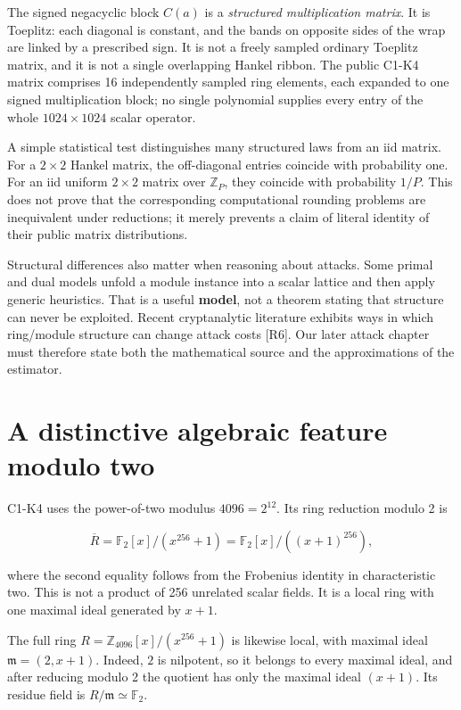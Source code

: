 \documentclass[
  11pt,
  a4paper,
  oneside]{report}
\begin{document}
The signed negacyclic block \(C(a)\) is a \emph{structured
multiplication matrix}. It is Toeplitz: each diagonal is constant, and
the bands on opposite sides of the wrap are linked by a prescribed sign.
It is not a freely sampled ordinary Toeplitz matrix, and it is not a
single overlapping Hankel ribbon. The public C1-K4 matrix comprises 16
independently sampled ring elements, each expanded to one signed
multiplication block; no single polynomial supplies every entry of the
whole \(1024\times1024\) scalar operator.

A simple statistical test distinguishes many structured laws from an iid
matrix. For a \(2\times2\) Hankel matrix, the off-diagonal entries
coincide with probability one. For an iid uniform \(2\times2\) matrix
over \(\mathbb Z_P\), they coincide with probability \(1/P\). This does
not prove that the corresponding computational rounding problems are
inequivalent under reductions; it merely prevents a claim of literal
identity of their public matrix distributions.

Structural differences also matter when reasoning about attacks. Some
primal and dual models unfold a module instance into a scalar lattice
and then apply generic heuristics. That is a useful \textbf{model}, not
a theorem stating that structure can never be exploited. Recent
cryptanalytic literature exhibits ways in which ring/module structure
can change attack costs {[}R6{]}. Our later attack chapter must
therefore state both the mathematical source and the approximations of
the estimator.

\section{A distinctive algebraic feature modulo
two}\label{a-distinctive-algebraic-feature-modulo-two}

C1-K4 uses the power-of-two modulus \(4096=2^{12}\). Its ring reduction
modulo 2 is

\[
\overline R=\mathbb F_2[x]/(x^{256}+1)
=\mathbb F_2[x]/((x+1)^{256}),
\]

where the second equality follows from the Frobenius identity in
characteristic two. This is not a product of 256 unrelated scalar
fields. It is a local ring with one maximal ideal generated by \(x+1\).

The full ring \(R=\mathbb Z_{4096}[x]/(x^{256}+1)\) is likewise local,
with maximal ideal \(\mathfrak m=(2,x+1)\). Indeed, \(2\) is nilpotent,
so it belongs to every maximal ideal, and after reducing modulo 2 the
quotient has only the maximal ideal \((x+1)\). Its residue field is
\(R/\mathfrak m\simeq\mathbb F_2\).
\end{document}
